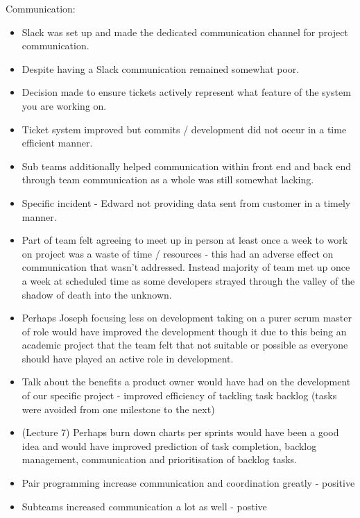 \documentclass{l3proj}
\begin{document}
Communication:
\begin{itemize}
\item Slack was set up and made the dedicated communication channel for project communication.
\item Despite having a Slack communication remained somewhat poor.
\item Decision made to ensure tickets actively represent what feature of the system you are working on.
\item Ticket system improved but commits / development did not occur in a time efficient manner.
\item Sub teams additionally helped communication within front end and back end through team communication as a whole was still somewhat lacking.
\item Specific incident - Edward not providing data sent from customer in a timely manner.
\item Part of team felt agreeing to meet up in person at least once a week to work on project was a waste of time / resources - this had an adverse effect on communication that wasn’t addressed. Instead majority of team met up once a week at scheduled time as some developers strayed through the valley of the shadow of death into the unknown.
\item Perhaps Joseph focusing less on development taking on a purer scrum master of role would have improved the development though it due to this being an academic project that the team felt that not suitable or possible as everyone should have played an active role in development.
\item Talk about the benefits a product owner would have had on the development of our specific project - improved efficiency of tackling task backlog (tasks were avoided from one milestone to the next)
\item (Lecture 7) Perhaps burn down charts per sprints would have been a good idea and would have improved prediction of task completion, backlog management, communication and prioritisation of backlog tasks.
\item Pair programming increase communication and coordination greatly - positive
\item Subteams increased communication a lot as well - postive
\end{itemize}
\end{document}
